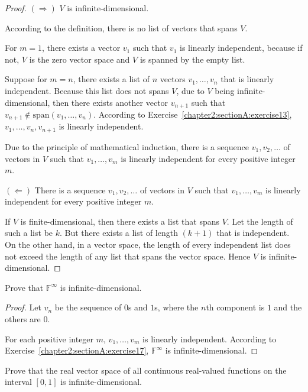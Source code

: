 \begin{proof}
    $(\Rightarrow)$ $V$ is infinite-dimensional.

    According to the definition, there is no list of vectors that spans $V$.

    For $m = 1$, there exists a vector $v_{1}$ such that $v_{1}$ is linearly independent, because if not, $V$ is the zero vector space and $V$ is spanned by the empty list.

    Suppose for $m = n$, there exists a list of $n$ vectors $v_{1}, \ldots, v_{n}$ that is linearly independent. Because this list does not spans $V$, due to $V$ being infinite-dimensional, then there exists another vector $v_{n+1}$ such that $v_{n+1}\notin \text{span}(v_{1}, \ldots, v_{n})$. According to Exercise~\ref{chapter2:sectionA:exercise13}, $v_{1}, \ldots, v_{n}, v_{n+1}$ is linearly independent.

    Due to the principle of mathematical induction, there is a sequence $v_{1}, v_{2}, \ldots$ of vectors in $V$ such that $v_{1}, \ldots, v_{m}$ is linearly independent for every positive integer $m$.

    $(\Leftarrow)$ There is a sequence $v_{1}, v_{2}, \ldots$ of vectors in $V$ such that $v_{1}, \ldots, v_{m}$ is linearly independent for every positive integer $m$.

    If $V$ is finite-dimensional, then there exists a list that spans $V$. Let the length of such a list be $k$. But there exists a list of length $(k + 1)$ that is independent. On the other hand, in a vector space, the length of every independent list does not exceed the length of any list that spans the vector space. Hence $V$ is infinite-dimensional.
\end{proof}

\begin{exercise}
    Prove that $\mathbb{F}^{\infty}$ is infinite-dimensional.
\end{exercise}

\begin{proof}
    Let $v_{n}$ be the sequence of $0$s and $1$s, where the $n$th component is $1$ and the others are $0$.

    For each positive integer $m$, $v_{1}, \ldots, v_{m}$ is linearly independent. According to Exercise~\ref{chapter2:sectionA:exercise17}, $\mathbb{F}^{\infty}$ is infinite-dimensional.
\end{proof}

\begin{exercise}
    Prove that the real vector space of all continuous real-valued functions on
    the interval $[0, 1]$ is infinite-dimensional.
\end{exercise}

